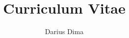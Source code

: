\documentclass[11pt, a4paper]{article}
\begin{document}
\title{Curriculum Vitae}
\author{Darius Dima}

\maketitle





\end{document}
